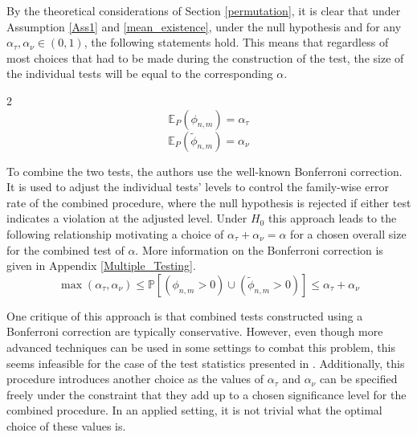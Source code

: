 \documentclass[12pt, a4paper]{article}
\theoremstyle{MAstyle} \newtheorem{assumption}{Assumption}[section]
\theoremstyle{MAstyle} \newtheorem{definition}{Definition}[section]
\theoremstyle{MAstyle} \newtheorem{theorem}{Theorem}[section]
\begin{document}
			By the theoretical considerations of Section \ref{permutation}, it is clear that under Assumption \ref{Ass1} and \ref{mean_existence}, under the null hypothesis and for any $\alpha_{\tau}, \alpha_{\nu} \in (0,1)$, the following statements hold. This means that regardless of most choices that had to be made during the construction of the test, the size of the individual tests will be equal to the corresponding $\alpha$.
			\begin{multicols}{2}
				\noindent
				\begin{equation*}
					\mathbb{E}_P\left(\phi_{n,m}\right) = \alpha_{\tau}
				\end{equation*}			
				\begin{equation}
					\mathbb{E}_P\left(\tilde{\phi}_{n,m}\right) = \alpha_{\nu}
				\end{equation}
			\end{multicols}
			
			To combine the two tests, the authors use the well-known Bonferroni correction. It is used to adjust the individual tests' levels to control the family-wise error rate of the combined procedure, where the null hypothesis is rejected if either test indicates a violation at the adjusted level.
			Under $H_0$ this approach leads to the following relationship motivating a choice of $\alpha_{\tau} + \alpha_{\nu} = \alpha$ for a chosen overall size for the combined test of $\alpha$. More information on the Bonferroni correction is given in Appendix \ref{Multiple_Testing}.
			\begin{equation}
				\max(\alpha_{\tau}, \alpha_{\nu}) \leq \mathbb{P}\left[(\phi_{n,m} > 0) \cup (\tilde{\phi}_{n,m} > 0)\right] \leq \alpha_{\tau} + \alpha_{\nu}
			\end{equation}

			One critique of this approach is that combined tests constructed using a Bonferroni correction are typically conservative. However, even though more advanced techniques can be used in some settings to combat this problem, this seems infeasible for the case of the test statistics presented in \cite{bugni_permutation_2021}.
			Additionally, this procedure introduces another choice as the values of $\alpha_{\tau}$ and $\alpha_{\nu}$ can be specified freely under the constraint that they add up to a chosen significance level for the combined procedure. In an applied setting, it is not trivial what the optimal choice of these values is.
		
		\newpage
\end{document}
